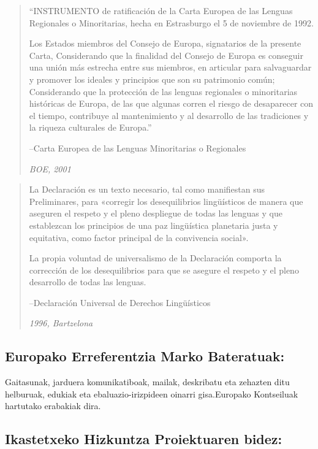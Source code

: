 \documentclass[
]{book}
\begin{document}
\begin{quote}
``INSTRUMENTO de ratificación de la Carta Europea de las Lenguas Regionales o Minoritarias, hecha en Estrasburgo el 5 de noviembre de 1992.

Los Estados miembros del Consejo de Europa, signatarios de la presente Carta, Considerando que la finalidad del Consejo de Europa es conseguir una unión más estrecha entre sus miembros, en articular para salvaguardar y promover los ideales y principios que son su patrimonio común; Considerando que la protección de las lenguas regionales o minoritarias históricas de Europa, de las que algunas corren el riesgo de desaparecer con el tiempo, contribuye al mantenimiento y al desarrollo de las tradiciones y la riqueza culturales de Europa.''

--Carta Europea de las Lenguas Minoritarias o Regionales

\emph{BOE, 2001}
\end{quote}

\begin{quote}
La Declaración es un texto necesario, tal como manifiestan sus Preliminares, para «corregir los desequilibrios lingüísticos de manera que aseguren el respeto y el pleno despliegue de todas las lenguas y que establezcan los principios de una paz lingüística planetaria justa y equitativa, como factor principal de la convivencia social».

La propia voluntad de universalismo de la Declaración comporta la corrección de los desequilibrios para que se asegure el respeto y el pleno desarrollo de todas las lenguas.

--Declaración Universal de Derechos Lingüísticos

\emph{1996, Bartzelona}
\end{quote}

\hypertarget{europako-erreferentzia-marko-bateratuak}{%
\subsection{Europako Erreferentzia Marko Bateratuak:}\label{europako-erreferentzia-marko-bateratuak}}

Gaitasunak, jarduera komunikatiboak, mailak, deskribatu eta zehazten ditu helburuak, edukiak eta ebaluazio-irizpideen oinarri gisa.Europako Kontseiluak hartutako erabakiak dira.

\hypertarget{ikastetxeko-hizkuntza-proiektuaren-bidez}{%
\subsection{Ikastetxeko Hizkuntza Proiektuaren bidez:}\label{ikastetxeko-hizkuntza-proiektuaren-bidez}}
\end{document}
